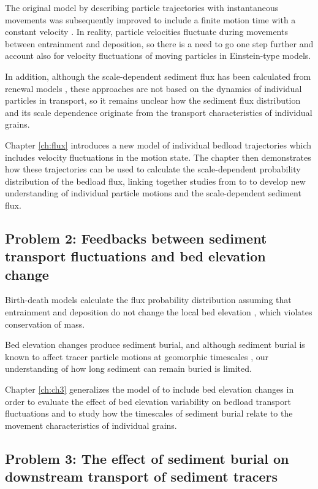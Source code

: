 The original model by \citet{Einstein1937} describing particle trajectories with instantaneous movements was subsequently improved to include a finite motion time with a constant velocity \citep{Lisle1998,Lajeunesse2017}.
In reality, particle velocities fluctuate during movements between entrainment and deposition, so there is a need to go one step further and account also for velocity fluctuations of moving particles in Einstein-type models.

In addition, although the scale-dependent sediment flux has been calculated from renewal models \citep{Turowski2010,Ancey2020}, these approaches are not based on the dynamics of individual particles in transport, so it remains unclear how the sediment flux distribution and its scale dependence originate from the transport characteristics of individual grains.

Chapter \ref{ch:flux} introduces a new model of individual bedload trajectories which includes velocity fluctuations in the motion state. The chapter then demonstrates how these trajectories can be used to calculate the scale-dependent probability distribution of the bedload flux, linking together studies from \citet{Einstein1937} to \citet{Ancey2020b} to develop new understanding of individual particle motions and the scale-dependent sediment flux.

\subsection{Problem 2: Feedbacks between sediment transport fluctuations and bed elevation change}

Birth-death models calculate the flux probability distribution assuming that entrainment and deposition do not change the local bed elevation \citep{Heyman2013,Ancey2014}, which violates conservation of mass.

Bed elevation changes produce sediment burial, and although sediment burial is known to affect tracer particle motions at geomorphic timescales \citep{Ferguson2002,Hassan2017}, our understanding of how long sediment can remain buried is limited.

Chapter \ref{ch:ch3} generalizes the model of \citet{Ancey2008} to include bed elevation changes in order to evaluate the effect of bed elevation variability on bedload transport fluctuations and to study how the timescales of sediment burial relate to the movement characteristics of individual grains.

\subsection{Problem 3: The effect of sediment burial on downstream transport of sediment tracers}

